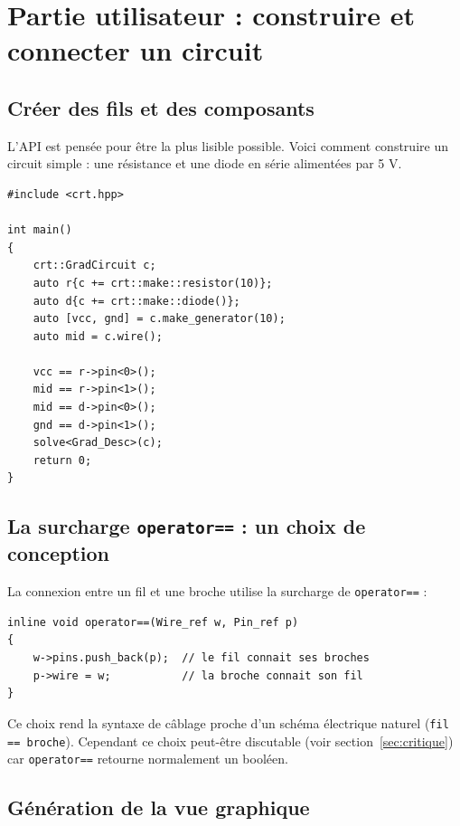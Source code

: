\documentclass[12pt,a4paper]{article}
\begin{document}
\section{Partie utilisateur : construire et connecter un circuit}

\subsection{Créer des fils et des composants}

L'API est pensée pour être la plus lisible possible. Voici comment construire un
circuit simple : une résistance et une diode en série alimentées par 5 V.

\begin{lstlisting}[caption={Exemple d'utilisation : circuit résistance + diode}]
#include <crt.hpp>

int main()
{
    crt::GradCircuit c;
    auto r{c += crt::make::resistor(10)};
    auto d{c += crt::make::diode()};
    auto [vcc, gnd] = c.make_generator(10);
    auto mid = c.wire();

    vcc == r->pin<0>(); 
    mid == r->pin<1>();
    mid == d->pin<0>(); 
    gnd == d->pin<1>();
    solve<Grad_Desc>(c);
    return 0;
}
\end{lstlisting}

\clearpage

\subsection{La surcharge \texttt{operator==} : un choix de conception}

La connexion entre un fil et une broche utilise la surcharge de \texttt{operator==} :

\begin{lstlisting}[caption={Surcharge de == pour la connexion (crtWire.hpp)}]
inline void operator==(Wire_ref w, Pin_ref p)
{
    w->pins.push_back(p);  // le fil connait ses broches
    p->wire = w;           // la broche connait son fil
}
\end{lstlisting}

Ce choix rend la syntaxe de câblage proche d'un schéma électrique naturel (\texttt{fil == broche}).
Cependant ce choix peut-être discutable (voir section~\ref{sec:critique}) car \texttt{operator==}
retourne normalement un booléen.

\subsection{Génération de la vue graphique}
\end{document}
